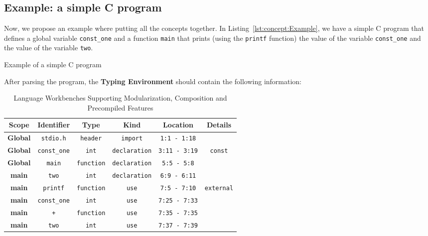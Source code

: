 \subsection{Example: a simple C program}\label{subsec:concept:ExampleASimpleCProgram}

Now, we propose an example where putting all the concepts together. In Listing~\ref{lst:concept:Example}, we have a simple C program that defines a global variable \texttt{const\_one} and a function \texttt{main} that prints (using the \texttt{printf} function) the value of the variable \texttt{const\_one} and the value of the variable \texttt{two}.

\begin{Listing}[t]
    \centering
    \caption{Example of a simple C program}
    \label{lst:concept:Example}
\end{Listing}

After parsing the program, the \textbf{Typing Environment} should contain the following information:

\begin{table}[t]
    \centering
    \begin{tabular}{ c c c c c c }
        \toprule  \textbf{Scope} & \textbf{Identifier} & \textbf{Type} & \textbf{Kind} & \textbf{Location} & \textbf{Details} \\
        \midrule
        \textbf{Global} & \texttt{stdio.h} & \texttt{header} & \texttt{import} & \texttt{1:1 - 1:18} &  \\
        \textbf{Global} & \texttt{const\_one} & \texttt{int} & \texttt{declaration} & \texttt{3:11 - 3:19} & \texttt{const} \\
        \textbf{Global} & \texttt{main} & \texttt{function} & \texttt{declaration} & \texttt{5:5 - 5:8} &  \\
        \textbf{main} & \texttt{two} & \texttt{int} & \texttt{declaration} & \texttt{6:9 - 6:11} & \\
        \textbf{main} & \texttt{printf} & \texttt{function} & \texttt{use} & \texttt{7:5 - 7:10} & \texttt{external} \\
        \textbf{main} & \texttt{const\_one} & \texttt{int} & \texttt{use} & \texttt{7:25 - 7:33} &  \\
        \textbf{main} & \texttt{+} & \texttt{function} & \texttt{use} & \texttt{7:35 - 7:35} &  \\
        \textbf{main} & \texttt{two} & \texttt{int} & \texttt{use} & \texttt{7:37 - 7:39} &  \\
        \bottomrule
    \end{tabular}
    \caption{Language Workbenches Supporting Modularization, Composition and Precompiled Features}
    \label{tab:concept:Example}
\end{table}

